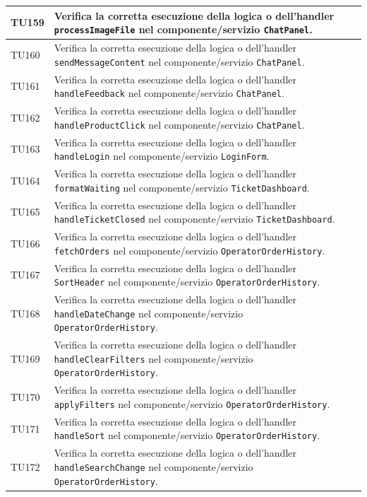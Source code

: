 \documentclass[a4paper,11pt,oneside]{scrartcl}
\begin{document}
\begin{longtable}{|p{1.9cm}|p{11.6cm}|c|}
TU159 & Verifica la corretta esecuzione della logica o dell'handler \texttt{processImageFile} nel componente/servizio \texttt{ChatPanel}. & \\ \hline
TU160 & Verifica la corretta esecuzione della logica o dell'handler \texttt{sendMessageContent} nel componente/servizio \texttt{ChatPanel}. & \\ \hline
TU161 & Verifica la corretta esecuzione della logica o dell'handler \texttt{handleFeedback} nel componente/servizio \texttt{ChatPanel}. & \\ \hline
TU162 & Verifica la corretta esecuzione della logica o dell'handler \texttt{handleProductClick} nel componente/servizio \texttt{ChatPanel}. & \\ \hline
TU163 & Verifica la corretta esecuzione della logica o dell'handler \texttt{handleLogin} nel componente/servizio \texttt{LoginForm}. & \\ \hline
TU164 & Verifica la corretta esecuzione della logica o dell'handler \texttt{formatWaiting} nel componente/servizio \texttt{TicketDashboard}. & \\ \hline
TU165 & Verifica la corretta esecuzione della logica o dell'handler \texttt{handleTicketClosed} nel componente/servizio \texttt{TicketDashboard}. & \\ \hline
TU166 & Verifica la corretta esecuzione della logica o dell'handler \texttt{fetchOrders} nel componente/servizio \texttt{OperatorOrderHistory}. & \\ \hline
TU167 & Verifica la corretta esecuzione della logica o dell'handler \texttt{SortHeader} nel componente/servizio \texttt{OperatorOrderHistory}. & \\ \hline
TU168 & Verifica la corretta esecuzione della logica o dell'handler \texttt{handleDateChange} nel componente/servizio \texttt{OperatorOrderHistory}. & \\ \hline
TU169 & Verifica la corretta esecuzione della logica o dell'handler \texttt{handleClearFilters} nel componente/servizio \texttt{OperatorOrderHistory}. & \\ \hline
TU170 & Verifica la corretta esecuzione della logica o dell'handler \texttt{applyFilters} nel componente/servizio \texttt{OperatorOrderHistory}. & \\ \hline
TU171 & Verifica la corretta esecuzione della logica o dell'handler \texttt{handleSort} nel componente/servizio \texttt{OperatorOrderHistory}. & \\ \hline
TU172 & Verifica la corretta esecuzione della logica o dell'handler \texttt{handleSearchChange} nel componente/servizio \texttt{OperatorOrderHistory}. & \\ \hline

\end{longtable}
\end{document}
